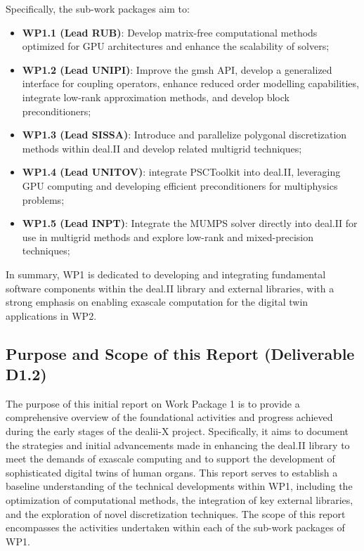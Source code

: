 \documentclass[a4paper,12pt]{article}
\begin{document}
Specifically, the sub-work packages aim to:
\begin{itemize}
    \item \textbf{WP1.1 (Lead RUB)}: Develop matrix-free computational methods optimized for GPU architectures and enhance the scalability of solvers;
    \item \textbf{WP1.2 (Lead UNIPI)}: Improve the gmsh API, develop a generalized interface for coupling operators, enhance reduced order modelling capabilities, integrate low-rank approximation methods, and develop block preconditioners;
    \item \textbf{WP1.3 (Lead SISSA)}: Introduce and parallelize polygonal discretization methods within deal.II and develop related multigrid techniques;
    \item \textbf{WP1.4 (Lead UNITOV)}: integrate PSCToolkit into deal.II, leveraging GPU computing and developing efficient preconditioners for multiphysics problems;
    \item \textbf{WP1.5 (Lead INPT)}: Integrate the MUMPS solver directly into deal.II for use in multigrid methods and explore low-rank and mixed-precision techniques;
\end{itemize}

In summary, WP1 is dedicated to developing and integrating fundamental software components within the deal.II library and external libraries, with a strong emphasis on enabling exascale computation for the digital twin applications in WP2.

\subsection{Purpose and Scope of this Report (Deliverable D1.2)}

The purpose of this initial report on Work Package 1 is to provide a
comprehensive overview of the foundational activities and progress achieved
during the early stages of the dealii-X project. Specifically, it aims to
document the strategies and initial advancements made in enhancing the deal.II
library to meet the demands of exascale computing and to support the development
of sophisticated digital twins of human organs. This report serves to establish
a baseline understanding of the technical developments within WP1, including the
optimization of computational methods, the integration of key external
libraries, and the exploration of novel discretization techniques. The scope of
this report encompasses the activities undertaken within each of the sub-work
packages of WP1. 
\end{document}
